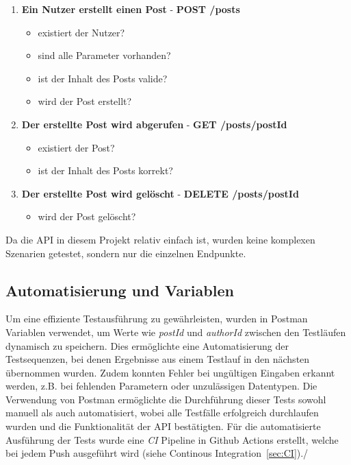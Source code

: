 \begin{enumerate}
    \item \textbf{Ein Nutzer erstellt einen Post} - \textbf{POST /posts}
        \begin{itemize}
            \item existiert der Nutzer?
            \item sind alle Parameter vorhanden?
            \item ist der Inhalt des Posts valide?
            \item wird der Post erstellt?
        \end{itemize}
    \item \textbf{Der erstellte Post wird abgerufen} - \textbf{GET /posts/{{postId}}}
        \begin{itemize}
            \item existiert der Post?
            \item ist der Inhalt des Posts korrekt?
        \end{itemize}
    \item \textbf{Der erstellte Post wird gelöscht} - \textbf{DELETE /posts/{{postId}}}
        \begin{itemize}
            \item wird der Post gelöscht?
        \end{itemize}
\end{enumerate}

Da die \ac{API} in diesem Projekt relativ einfach ist, wurden keine komplexen Szenarien getestet, sondern nur die einzelnen Endpunkte.

\subsection{Automatisierung und Variablen}

Um eine effiziente Testausführung zu gewährleisten, wurden in Postman Variablen verwendet, 
um Werte wie \textit{postId} und \textit{authorId} zwischen den Testläufen dynamisch zu speichern. 
Dies ermöglichte eine Automatisierung der Testsequenzen, bei denen Ergebnisse aus einem Testlauf in den nächsten übernommen wurden. 
Zudem konnten Fehler bei ungültigen Eingaben erkannt werden, z.B. bei fehlenden Parametern oder unzulässigen Datentypen.
Die Verwendung von Postman ermöglichte die Durchführung dieser Tests sowohl manuell als auch automatisiert,
wobei alle Testfälle erfolgreich durchlaufen wurden und die Funktionalität der \ac{API} bestätigten.
Für die automatisierte Ausführung der Tests wurde eine \textit{\ac{CI}} Pipeline in Github Actions erstellt, welche bei jedem Push ausgeführt wird (siehe Continous Integration~\ref{sec:CI})./

